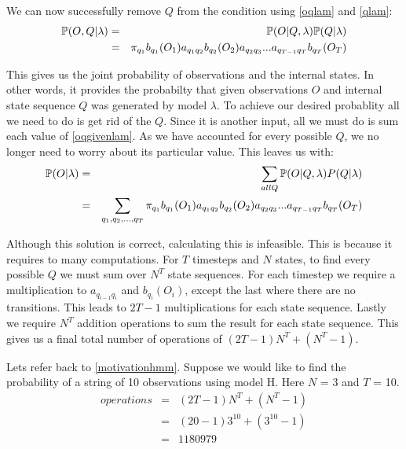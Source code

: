 We can now successfully remove $Q$ from the condition using \ref{oqlam} and \ref{qlam}:
\begin{eqnarray}
    \label{oqgivenlam}
    \mathbb{P} (O,Q | \lambda) & = & \mathbb{P}(O | Q, \lambda) \mathbb{P}(Q | \lambda) \\
                          & = & \pi_{q_1} b_{q_1}(O_1) a_{q_1q_2} b_{q_2}(O_2) a_{q_2q_3} ... a_{q_{T-1}q_T} b_{q_T}(O_T)
\end{eqnarray}

This gives us the joint probability of observations and the internal states. In other words, it provides the probabilty that given observations $O$ and internal state sequence $Q$ was generated by model $\lambda$. To achieve our desired probablity all we need to do is get rid of the $Q$. Since it is another input, all we must do is sum each value of \ref{oqgivenlam}. As we have accounted for every possible $Q$, we no longer need to worry about its particular value. This leaves us with:
\begin{eqnarray}
    \label{ogivenlamsumq}
    \mathbb{P} (O | \lambda) & = & \sum_{all Q} \mathbb{P}(O| Q,\lambda)P(Q|\lambda) \\
                        & = & \sum_{q_1,q_2,...,q_T} \pi_{q_1} b_{q_1}(O_1) a_{q_1q_2} b_{q_2}(O_2) a_{q_2q_3} ... a_{q_{T-1}q_T} b_{q_T}(O_T)
\end{eqnarray} 

Although this solution is correct, calculating this is infeasible. This is because it requires to many computations. For $T$ timesteps and $N$ states, to find every possible $Q$ we must sum over $N^T$ state sequences. For each timestep we require a multiplication to $a_{q_{i-1}q_{i}}$ and $b_{q_i}(O_i)$, except the last where there are no transitions. This leads to $2T-1$ multiplications for each state sequence. Lastly we require $N^T$ addition operations to sum the result for each state sequence. This gives us a final total number of operations of $(2T-1)N^T + (N^T-1)$. 

\begin{example}
    \label{motivfb}
    Lets refer back to \ref{motivationhmm}. Suppose we would like to find the probability of a string of 10 observations using model H. Here $N$ = 3 and $T$ = 10. 
    \begin{eqnarray}
        operations & = & (2T-1)N^T + (N^T-1) \\
                   & = & (20-1)3^10 + (3^10 -1) \\
                   & = & 1180979
    \end{eqnarray}
\end{example}


